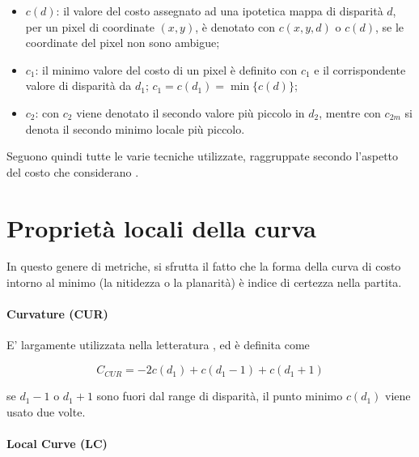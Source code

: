 \documentclass[12pt]{report}
\begin{document}
			\begin{itemize}
				\item $c(d)$: il valore del costo assegnato ad una ipotetica mappa di disparità $d$, per un pixel di coordinate $(x,y)$, è denotato con $c(x,y,d)$ o $c(d)$, se le coordinate del pixel non sono ambigue;
			
				\item $c_{1}$: il minimo valore del costo di un pixel è definito con $c_{1}$ e il corrispondente valore di disparità da $d_{1}$; $c_{1}=c(d_{1})=\min\{c(d)\}$;
			
				\item $c_{2}$: con $c_{2}$ viene denotato il secondo valore più piccolo in $d_{2}$, mentre con $c_{2m}$ si denota il secondo minimo locale più piccolo.
				\label{item:definizioni}
			\end{itemize}
			
			Seguono quindi tutte le varie tecniche utilizzate, raggruppate secondo l'aspetto del costo che considerano \cite{indoors_outdoors}.
		
		
		
		\section{Proprietà locali della curva}
		\label{sec:localProperties}	
			In questo genere di metriche, si sfrutta il fatto che la forma della curva di costo intorno al minimo (la nitidezza o la planarità) è indice di certezza nella partita.
			
			\paragraph{Curvature (CUR)}
			\label{par:curvature}
			
				E' largamente utilizzata nella letteratura \cite{indoors_outdoors}, ed è definita come
				
				\begin{equation}
					C_{CUR}=-2c(d_{1})+c(d_{1}-1)+c(d_{1}+1)
					\label{eq:CUR}
				\end{equation} 
			
				\noindent se $d_{1}-1$ o $d_{1}+1$ sono fuori dal range di disparità, il punto minimo $c(d_{1})$ viene usato due volte.
			
			
			\paragraph{Local Curve (LC)} 
			\label{par:local}
			
\end{document}
